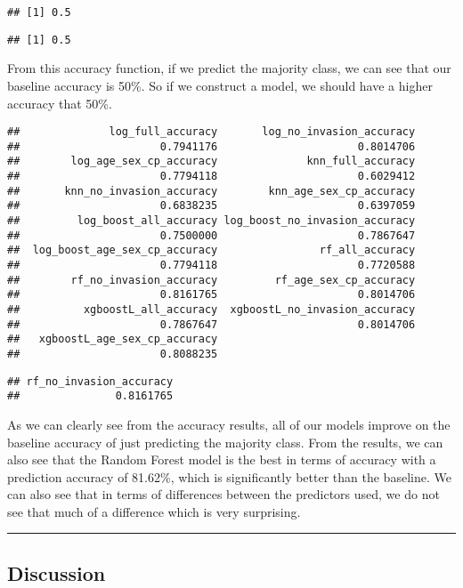 \documentclass[
]{article}
\begin{document}
\begin{verbatim}
## [1] 0.5
\end{verbatim}

\begin{verbatim}
## [1] 0.5
\end{verbatim}

From this accuracy function, if we predict the majority class, we can
see that our baseline accuracy is 50\%. So if we construct a model, we
should have a higher accuracy that 50\%.

\begin{verbatim}
##              log_full_accuracy       log_no_invasion_accuracy 
##                      0.7941176                      0.8014706 
##        log_age_sex_cp_accuracy              knn_full_accuracy 
##                      0.7794118                      0.6029412 
##       knn_no_invasion_accuracy        knn_age_sex_cp_accuracy 
##                      0.6838235                      0.6397059 
##         log_boost_all_accuracy log_boost_no_invasion_accuracy 
##                      0.7500000                      0.7867647 
##  log_boost_age_sex_cp_accuracy                rf_all_accuracy 
##                      0.7794118                      0.7720588 
##        rf_no_invasion_accuracy         rf_age_sex_cp_accuracy 
##                      0.8161765                      0.8014706 
##          xgboostL_all_accuracy  xgboostL_no_invasion_accuracy 
##                      0.7867647                      0.8014706 
##   xgboostL_age_sex_cp_accuracy 
##                      0.8088235
\end{verbatim}

\begin{verbatim}
## rf_no_invasion_accuracy 
##               0.8161765
\end{verbatim}

As we can clearly see from the accuracy results, all of our models
improve on the baseline accuracy of just predicting the majority class.
From the results, we can also see that the Random Forest model is the
best in terms of accuracy with a prediction accuracy of 81.62\%, which
is significantly better than the baseline. We can also see that in terms
of differences between the predictors used, we do not see that much of a
difference which is very surprising.

\begin{center}\rule{0.5\linewidth}{0.5pt}\end{center}

\hypertarget{discussion}{%
\subsection{Discussion}\label{discussion}}
\end{document}
